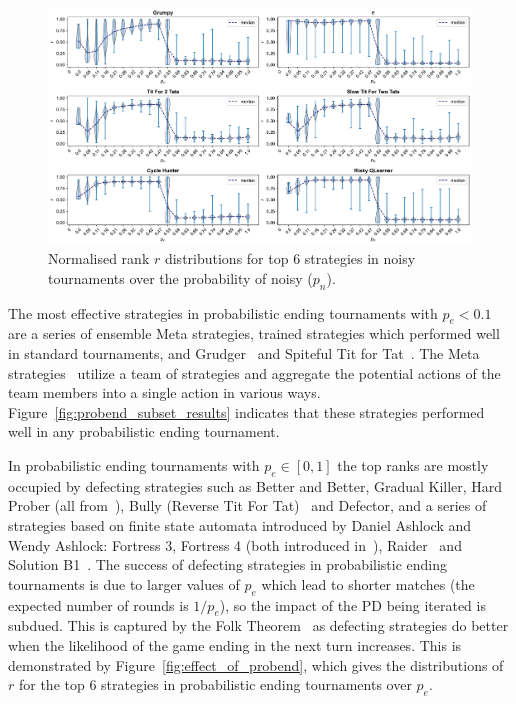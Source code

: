 \begin{figure}[!htbp]
    \centering
    \includegraphics[width=.92\textwidth]{../images/noise_effect.pdf}
    \caption{Normalised rank \(r\) distributions for top 6 strategies in noisy tournaments over
    the probability of noisy ($p_n$).}
    \label{fig:effect_of_noise}
\end{figure}

The most effective strategies in probabilistic ending
tournaments with \(p_e< 0.1\) are a series of ensemble Meta strategies, trained strategies
which performed well
in standard tournaments, and Grudger~\cite{axelrodproject} and Spiteful Tit for
Tat~\cite{prison}. The Meta strategies~\cite{axelrodproject} utilize a team of
strategies and aggregate the potential actions of the team members into a single action
in various ways. Figure~\ref{fig:probend_subset_results} indicates that these strategies
performed well in any probabilistic ending tournament.

In probabilistic ending tournaments with \(p_e \in [0, 1]\) the top ranks are
mostly occupied by defecting strategies such as Better and Better, Gradual
Killer, Hard Prober (all from~\cite{axelrodproject}), Bully (Reverse Tit For
Tat)~\cite{Nachbar1992} and Defector, and a series of strategies based on finite
state automata introduced by Daniel Ashlock and Wendy Ashlock: Fortress 3,
Fortress 4 (both introduced in~\cite{Ashlock2006}), Raider~\cite{Ashlock2014}
and Solution B1~\cite{Ashlock2014}. The success of defecting strategies in
probabilistic ending tournaments is due to larger values of
\(p_e\) which lead to shorter matches (the expected number of rounds is \(1 / p_e\)), so the
impact of the PD being iterated is subdued. This is captured by the Folk
Theorem~\cite{Fudenberg2009} as defecting strategies do better when the likelihood
of the game ending in the next turn increases.
This is demonstrated by Figure~\ref{fig:effect_of_probend}, which gives the
distributions of \(r\) for the top 6 strategies in probabilistic ending tournaments
over \(p_e\).

